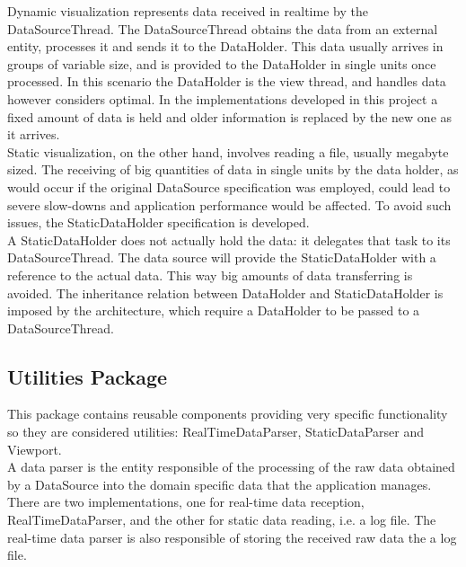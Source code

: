 		Dynamic visualization represents data received in realtime by the DataSourceThread. The DataSourceThread obtains the data from an external entity, processes it and sends it to the DataHolder. This data usually arrives in groups of variable size, and is provided to the DataHolder in single units once processed. In this scenario the DataHolder is the view thread, and handles data however considers optimal. In the implementations developed in this project a fixed amount of data is held and older information is replaced by the new one as it arrives.\\

		Static visualization, on the other hand, involves reading a file, usually megabyte sized. The receiving of big quantities of data in single units by the data holder, as would occur if  the original DataSource specification was employed, could lead to severe slow-downs and application performance would be affected. To avoid such issues, the StaticDataHolder specification is developed.\\

		A StaticDataHolder does not actually hold the data: it delegates that task to its DataSourceThread. The data source will provide the StaticDataHolder with a reference to the actual data. This way big amounts of data transferring is avoided. The inheritance relation between DataHolder and StaticDataHolder is imposed by the architecture, which require a DataHolder to be passed to a DataSourceThread.\\

		\subsection{Utilities Package}

		This package contains reusable components providing very specific functionality so they are considered utilities: RealTimeDataParser, StaticDataParser and Viewport.\\

		A data parser is the entity responsible of the processing of the raw data obtained by a DataSource into the domain specific data that the application manages. There are two implementations, one for real-time data reception, RealTimeDataParser, and the other for static data reading, i.e. a log file. The real-time data parser is also responsible of storing the received raw data the a log file.\\


